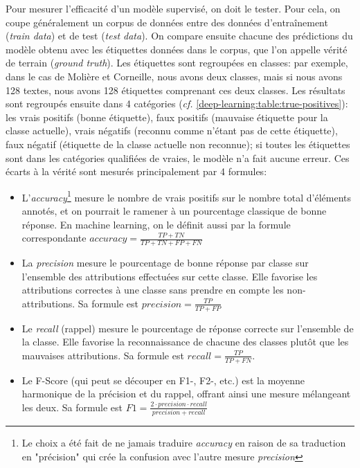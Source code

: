 Pour mesurer l'efficacité d'un modèle supervisé, on doit le tester. Pour cela, on coupe généralement un corpus de données entre des données d'entraînement (\textit{train data}) et de test (\textit{test data}). On compare ensuite chacune des prédictions du modèle obtenu avec les étiquettes données dans le corpus, que l'on appelle vérité de terrain (\textit{ground truth}). Les étiquettes sont regroupées en classes: par exemple, dans le cas de Molière et Corneille, nous avons deux classes, mais si nous avons 128 textes, nous avons 128 étiquettes comprenant ces deux classes. Les résultats sont regroupés ensuite dans 4 catégories (\textit{cf.} \ref{deep-learning:table:true-positives}): les vrais positifs (bonne étiquette), faux positifs (mauvaise étiquette pour la classe actuelle), vrais négatifs (reconnu comme n'étant pas de cette étiquette), faux négatif (étiquette de la classe actuelle non reconnue); si toutes les étiquettes sont dans les catégories qualifiées de vraies, le modèle n'a fait aucune erreur. Ces écarts à la vérité sont mesurés principalement par 4 formules:
\begin{itemize}
    \item L'\textit{accuracy}\footnote{Le choix a été fait de ne jamais traduire \textit{accuracy} en raison de sa traduction en "précision" qui crée la confusion avec l'autre mesure \textit{precision}} mesure le nombre de vrais positifs sur le nombre total d'éléments annotés, et on pourrait le ramener à un pourcentage classique de bonne réponse. En machine learning, on le définit aussi par la formule correspondante $accuracy = \frac{TP + TN}{TP + TN + FP + FN}$
    \item La \textit{precision} mesure le pourcentage de bonne réponse par classe sur l'ensemble des attributions effectuées sur cette classe. Elle favorise les attributions correctes à une classe sans prendre en compte les non-attributions. Sa formule est $precision = \frac{TP}{TP + FP}$
    \item Le \textit{recall} (rappel) mesure le pourcentage de réponse correcte sur l'ensemble de la classe. Elle favorise la reconnaissance de chacune des classes plutôt que les mauvaises attributions. Sa formule est $recall = \frac{TP}{TP+FN}$.
    \item Le F-Score (qui peut se découper en F1-, F2-, etc.) est la moyenne harmonique de la précision et du rappel, offrant ainsi une mesure mélangeant les deux. Sa formule est $F1 = \frac{2 \cdot precision\cdot recall}{precision+ recall}$
\end{itemize}{}

